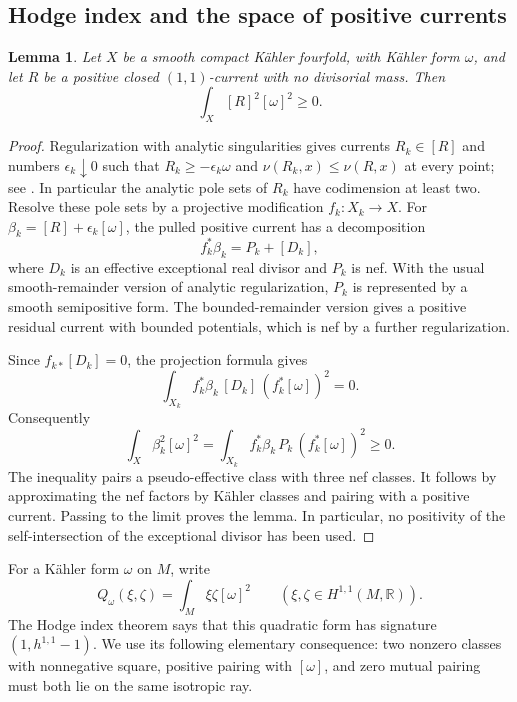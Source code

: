 \documentclass[11pt,letterpaper]{article}
\newcommand{\R}{\mathbb{R}}
\newtheorem{lemma}[theorem]{Lemma}
\theoremstyle{definition}
\theoremstyle{remark}
\begin{document}
\subsection{Hodge index and the space of positive currents}

\begin{lemma}\label{fol:nonnegative-square}
Let $X$ be a smooth compact K\"ahler fourfold, with K\"ahler form
$\omega$, and let $R$ be a positive closed $(1,1)$-current with no
divisorial mass.  Then
\[
 \int_X [R]^2[\omega]^2\geq0.
\]
\end{lemma}

\begin{proof}
Regularization with analytic singularities gives currents
$R_k\in[R]$ and numbers $\epsilon_k\downarrow0$ such that
$R_k\geq-\epsilon_k\omega$ and
$\nu(R_k,x)\leq\nu(R,x)$ at every point; see
\cite[Theorem~2.1(ii)]{BoucksomDivisorialZariski}.
In particular the analytic pole sets of $R_k$ have codimension at least
two.  Resolve these pole sets by a projective modification
$f_k\colon X_k\to X$.  For
$\beta_k=[R]+\epsilon_k[\omega]$, the pulled positive current has a
decomposition
\[
 f_k^*\beta_k=P_k+[D_k],
\]
where $D_k$ is an effective exceptional real divisor and $P_k$ is nef.
With the usual smooth-remainder version of analytic regularization,
$P_k$ is represented by a smooth semipositive form.  The
bounded-remainder version gives a positive residual current with bounded
potentials, which is nef by a further regularization.

Since $f_{k*}[D_k]=0$, the projection formula gives
\[
 \int_{X_k} f_k^*\beta_k\,[D_k]\,(f_k^*[\omega])^2=0.
\]
Consequently
\begin{equation}\label{fol:square-resolution}
 \int_X\beta_k^2[\omega]^2
 =
 \int_{X_k} f_k^*\beta_k\,P_k\,(f_k^*[\omega])^2
 \geq0.
\end{equation}
The inequality pairs a pseudo-effective class with three nef classes.
It follows by approximating the nef factors by K\"ahler classes and
pairing with a positive current.  Passing to the limit proves the lemma.
In particular, no positivity of the self-intersection of the
exceptional divisor has been used.
\end{proof}

For a K\"ahler form $\omega$ on $M$, write
\[
 Q_\omega(\xi,\zeta)=\int_M\xi\zeta[\omega]^2
 \qquad(\xi,\zeta\in H^{1,1}(M,\R)).
\]
The Hodge index theorem says that this quadratic form has signature
$(1,h^{1,1}-1)$.  We use its following elementary consequence:
two nonzero classes with nonnegative square, positive pairing with
$[\omega]$, and zero mutual pairing must both lie on the same isotropic
ray.
\end{document}
